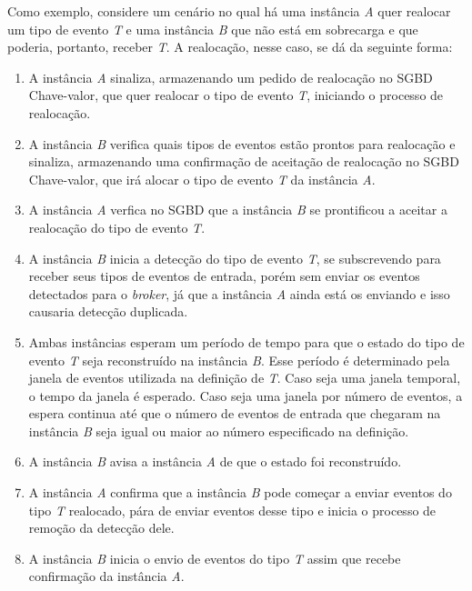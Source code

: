 Como exemplo, considere um cenário no qual há uma instância \textit{A} quer realocar um tipo de evento \textit{T} e uma instância \textit{B} que não está em sobrecarga e que poderia, portanto, receber \textit{T}. A realocação, nesse caso, se dá da seguinte forma: 
\begin{enumerate}
    \item  A instância \textit{A} sinaliza, armazenando um pedido de realocação no SGBD Chave-valor, que quer realocar o tipo de evento \textit{T}, iniciando o processo de realocação.
    \item A instância \textit{B} verifica quais tipos de eventos estão prontos para realocação e sinaliza, armazenando uma confirmação de aceitação de realocação no SGBD Chave-valor, que irá alocar o tipo de evento \textit{T} da instância \textit{A}. 
    \item A instância \textit{A} verfica no SGBD que a instância \textit{B} se prontificou a aceitar a realocação do tipo de evento \textit{T}.%
    \item A instância \textit{B} inicia a detecção do tipo de evento \textit{T}, se subscrevendo para receber seus tipos de eventos de entrada, porém sem enviar os eventos detectados para o \textit{broker}, já que a instância \textit{A} ainda está os enviando e isso causaria detecção duplicada.
    \item Ambas instâncias esperam um período de tempo para que o estado do tipo de evento \textit{T} seja reconstruído na instância \textit{B}. Esse período é determinado pela janela de eventos utilizada na definição de \textit{T}. Caso seja uma janela temporal, o tempo da janela é esperado. Caso seja uma janela por número de eventos, a espera continua até que o número de eventos de entrada que chegaram na instância \textit{B} seja igual ou maior ao número especificado na definição.
    \item A instância \textit{B} avisa a instância \textit{A} de que o estado foi reconstruído.
    \item A instância \textit{A} confirma que a instância \textit{B} pode começar a enviar eventos do tipo \textit{T} realocado, pára de enviar eventos desse tipo e inicia o processo de remoção da detecção dele.
    \item A instância \textit{B} inicia o envio de eventos do tipo \textit{T} assim que recebe confirmação da instância \textit{A}.
\end{enumerate}

